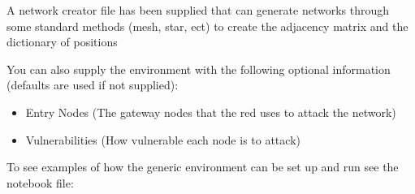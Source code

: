 \documentclass[letterpaper,10pt,english]{sphinxmanual}
\begin{document}
\sphinxAtStartPar
A network creator file has been supplied that can generate networks through
some standard methods (mesh, star, ect) to create the adjacency matrix and
the dictionary of positions

\sphinxAtStartPar
You can also supply the environment with the following optional information
(defaults are used if not supplied):
\begin{itemize}
\item {}
\sphinxAtStartPar
Entry Nodes (The gateway nodes that the red uses to attack the network)

\item {}
\sphinxAtStartPar
Vulnerabilities (How vulnerable each node is to attack)

\end{itemize}

\sphinxAtStartPar
To see examples of how the generic environment can be set up and run
see the notebook file:
\begin{quote}

\sphinxAtStartPar
{}
\end{quote}
\end{document}
